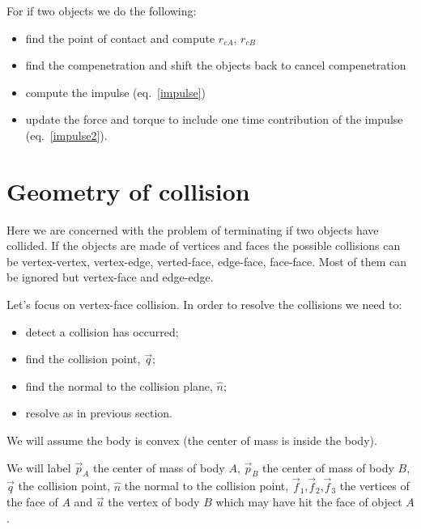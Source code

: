 \documentclass[12pt]{article}
\begin{document}
For if two objects we do the following:
\begin{itemize}
\item find the point of contact and compute $r_{cA}$, $r_{cB}$
\item find the compenetration and shift the objects back to cancel compenetration
\item compute the impulse (eq.~\ref{impulse})
\item update the force and torque to include one time contribution of the impulse (eq.~\ref{impulse2}).
\end{itemize}

\section{Geometry of collision}

Here we are concerned with the problem of terminating if two objects have collided. If the objects are made of vertices and faces the possible collisions can be vertex-vertex, vertex-edge, verted-face, edge-face, face-face. Most of them can be ignored but vertex-face and edge-edge.

Let's focus on vertex-face collision. In order to resolve the collisions we need to:
\begin{itemize}
\item detect a collision has occurred;
\item find the collision point, $\vec q$;
\item find the normal to the collision plane, $\hat n$;
\item resolve as in previous section.
\end{itemize}

We will assume the body is convex (the center of mass is inside the body).

We will label $\vec p_A$ the center of mass of body $A$, $\vec p_B$ the center of mass of body $B$, $\vec q$ the collision point, $\hat n$ the normal to the collision point, $\vec f_1$,$\vec f_2$,$\vec f_3$ the vertices of the face of $A$ and $\vec u$ the vertex of body $B$ which may have hit the face of object $A$.
\end{document}
